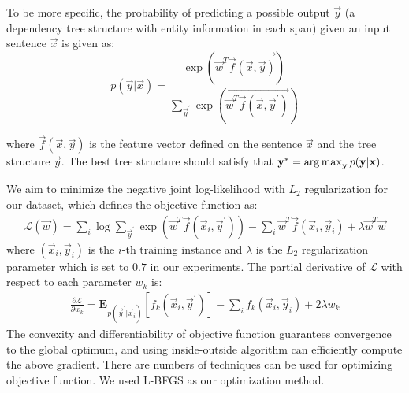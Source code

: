 To be more specific, the probability of predicting a possible output $\vec{y}$ (a dependency tree structure with entity information in each span) given an input sentence $\vec{x}$ is given as:
\begin{equation}
p(\vec{y}|\vec{x}) = \frac{\exp(\vec{\vec{w}^{T}\vec{f}(\vec{x},\vec{y}) })}{\sum_{\vec{y}^{'}}\exp(\vec{\vec{w}^{T}\vec{f}(\vec{x},\vec{y}^{'}) })}
\end{equation}

where $\vec{f}(\vec{x},\vec{y})$ is the feature vector defined on the sentence $\vec{x}$ and the tree structure $\vec{y}$. The best tree structure should satisfy that $\mathbf{y}^{*} = \operatorname*{arg\,max}_{\mathbf{y}}p(\mathbf{y}|\mathbf{x})$. 

We aim to minimize the negative joint log-likelihood with $\textit{L}_{2}$ regularization for our dataset, which defines the objective function as:
\begin{equation}
\begin{split}
\mathcal{L}(\vec{w}) = \sum_{i}\log\sum_{\vec{y}^{'}}\exp(\vec{w}^{T}\vec{f}(\vec{x}_{i},\vec{y}^{'})) - \sum_{i}\vec{w}^{T}\vec{f}(\vec{x}_{i},\vec{y}_{i}) + \lambda \vec{w}^{T}\vec{w}
\end{split}
\end{equation} 
where $(\vec{x}_{i},\vec{y}_{i})$ is the $i$-th training instance and $\lambda$ is the $L_{2}$ regularization parameter which is set to $0.7$ in our experiments. The partial derivative of $\mathcal{L}$ with respect to each parameter $w_{k}$ is:
\begin{equation}
\begin{split}
\frac{\partial\mathcal{L}}{\partial w_{k}}  = \mathbf{E}_{p(\vec{y}^{'}|\vec{x}_{i})} \left [f_{k}(\vec{x}_{i}, \vec{y}^{'})    \right ] - \sum_{i} f_{k}(\vec{x}_{i}, \vec{y}_{i}) + 2\lambda w_{k}
\end{split}
\end{equation}
The convexity and differentiability of objective function guarantees convergence to the global optimum, and using inside-outside algorithm can efficiently compute the above gradient. There are numbers of techniques can be used for optimizing objective function. We used L-BFGS \cite{byrd1995limited} as our optimization method.

